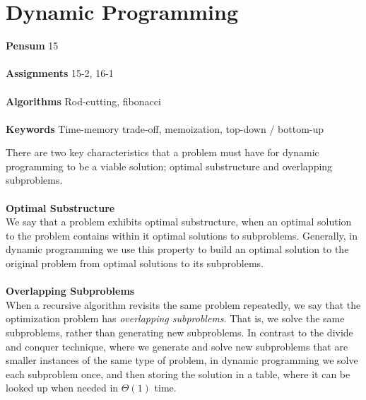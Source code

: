 
\chapter{Dynamic Programming}
\label{ch:dynamicprog}

\textbf{Pensum} 15 \cite{clrs} \\\\
\textbf{Assignments} 15-2, 16-1 \\\\
\textbf{Algorithms} Rod-cutting, fibonacci \\\\
\textbf{Keywords} Time-memory trade-off, memoization, top-down / bottom-up
\vspace{1in}

\noindent There are two key characteristics that a problem must have for
dynamic programming to be a viable solution; optimal substructure and
overlapping subproblems.
\\\\
\noindent \textbf{Optimal Substructure}\\
We say that a problem exhibits optimal substructure, when an optimal solution
to the problem contains within it optimal solutions to subproblems. Generally,
in dynamic programming we use this property to build an optimal solution to
the original problem from optimal solutions to its subproblems.
\\\\
\noindent \textbf{Overlapping Subproblems}\\
When a recursive algorithm revisits the same problem repeatedly, we say that
the optimization problem has \textit{overlapping subproblems}. That is, we
solve the same subproblems, rather than generating new subproblems. In
contrast to the divide and conquer technique, where we generate and solve new
subproblems that are smaller instances of the same type of problem, in dynamic
programming we solve each subproblem once, and then storing the solution in a
table, where it can be looked up when needed in $\Theta(1)$ time.

\newpage
